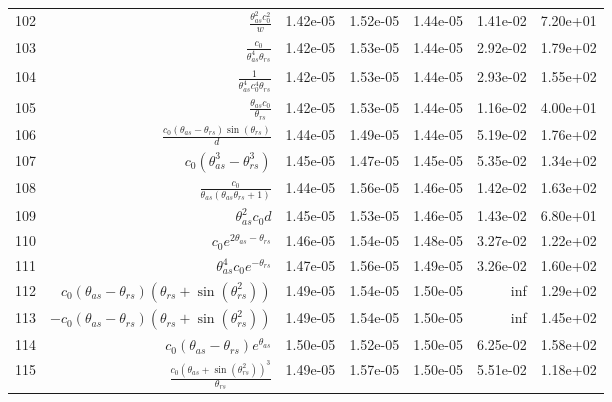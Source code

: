 \begin{tabularx}{\textwidth}{lRRRRRl}
102  &  $ \displaystyle\frac{\theta_{as}^{2} c_{0}^{2}}{w} $  &  1.42e-05  &  1.52e-05  &  1.44e-05  &  1.41e-02  &  7.20e+01  \\ 
103  &  $ \displaystyle\frac{c_{0}}{\theta_{as}^{4} \theta_{rs}} $  &  1.42e-05  &  1.53e-05  &  1.44e-05  &  2.92e-02  &  1.79e+02  \\ 
104  &  $ \displaystyle\frac{1}{\theta_{as}^{4} c_{0}^{4} \theta_{rs}} $  &  1.42e-05  &  1.53e-05  &  1.44e-05  &  2.93e-02  &  1.55e+02  \\ 
105  &  $ \displaystyle\frac{\theta_{as} c_{0}}{\theta_{rs}} $  &  1.42e-05  &  1.53e-05  &  1.44e-05  &  1.16e-02  &  4.00e+01  \\ 
106  &  $ \displaystyle\frac{c_{0} \left(\theta_{as} - \theta_{rs}\right) \sin{\left(\theta_{rs} \right)}}{d} $  &  1.44e-05  &  1.49e-05  &  1.44e-05  &  5.19e-02  &  1.76e+02  \\ 
107  &  $ c_{0} \left(\theta_{as}^{3} - \theta_{rs}^{3}\right) $  &  1.45e-05  &  1.47e-05  &  1.45e-05  &  5.35e-02  &  1.34e+02  \\ 
108  &  $ \displaystyle\frac{c_{0}}{\theta_{as} \left(\theta_{as} \theta_{rs} + 1\right)} $  &  1.44e-05  &  1.56e-05  &  1.46e-05  &  1.42e-02  &  1.63e+02  \\ 
109  &  $ \theta_{as}^{2} c_{0} d $  &  1.45e-05  &  1.53e-05  &  1.46e-05  &  1.43e-02  &  6.80e+01  \\ 
110  &  $ c_{0} e^{2 \theta_{as} - \theta_{rs}} $  &  1.46e-05  &  1.54e-05  &  1.48e-05  &  3.27e-02  &  1.22e+02  \\ 
111  &  $ \theta_{as}^{4} c_{0} e^{- \theta_{rs}} $  &  1.47e-05  &  1.56e-05  &  1.49e-05  &  3.26e-02  &  1.60e+02  \\ 
112  &  $ c_{0} \left(\theta_{as} - \theta_{rs}\right) \left(\theta_{rs} + \sin{\left(\theta_{rs}^{2} \right)}\right) $  &  1.49e-05  &  1.54e-05  &  1.50e-05  &  inf  &  1.29e+02  \\ 
113  &  $ - c_{0} \left(\theta_{as} - \theta_{rs}\right) \left(\theta_{rs} + \sin{\left(\theta_{rs}^{2} \right)}\right) $  &  1.49e-05  &  1.54e-05  &  1.50e-05  &  inf  &  1.45e+02  \\ 
114  &  $ c_{0} \left(\theta_{as} - \theta_{rs}\right) e^{\theta_{as}} $  &  1.50e-05  &  1.52e-05  &  1.50e-05  &  6.25e-02  &  1.58e+02  \\ 
115  &  $ \displaystyle\frac{c_{0} \left(\theta_{as} + \sin{\left(\theta_{rs}^{2} \right)}\right)^{3}}{\theta_{rs}} $  &  1.49e-05  &  1.57e-05  &  1.50e-05  &  5.51e-02  &  1.18e+02  \\ 

\end{tabularx}

